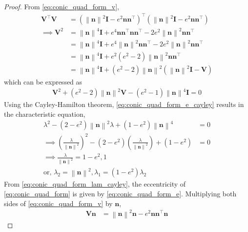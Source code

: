\documentclass[]{interact}
\theoremstyle{plain}%
\theoremstyle{definition}
\theoremstyle{remark}
\providecommand{\brak}[1]{\ensuremath{\left(#1\right)}}
\providecommand{\norm}[1]{\left\lVert#1\right\rVert}
\let\vec\mathbf
\begin{document}
\begin{proof}
  From \eqref{eq:conic_quad_form_v},
  \begin{align}
    \vec{V}^{\top} \vec{V}&=\brak{\norm{\vec{n}}^2\vec{I}-e^2\vec{n}\vec{n}^{\top}}^{\top}\brak{\norm{\vec{n}}^2\vec{I}-e^2\vec{n}\vec{n}^{\top}}
    \\
    \implies \vec{V}^{2} &= \norm{\vec{n}}^4\vec{I}+e^4\vec{n}\vec{n}^{\top}\vec{n}\vec{n}^{\top}-2e^2\norm{\vec{n}}^2\vec{n}\vec{n}^{\top}
    \\
    &= \norm{\vec{n}}^4\vec{I} + e^4\norm{\vec{n}}^2\vec{n}\vec{n}^{\top} - 2e^2\norm{\vec{n}}^2\vec{n}\vec{n}^{\top}
    \\
    &= \norm{\vec{n}}^4\vec{I} + e^2\brak{e^2 - 2}\norm{\vec{n}}^2\vec{n}\vec{n}^{\top}
    \\
    &= \norm{\vec{n}}^4\vec{I} + \brak{e^2 - 2}\norm{\vec{n}}^2\brak{\norm{\vec{n}}^2\vec{I}- \vec{V}}
    \end{align}
%    
which can be expressed as
\begin{align}
  \vec{V}^{2} + \brak{e^2 - 2}\norm{\vec{n}}^2\vec{V} - \brak{e^2 - 1}\norm{\vec{n}}^4\vec{I}=0
  \label{eq:conic_quad_form_e_cayley}
\end{align}
Using the Cayley-Hamilton theorem, \eqref{eq:conic_quad_form_e_cayley} results in the characteristic equation, 
\begin{align}
  \lambda^{2} - \brak{2-e^2}\norm{\vec{n}}^2\lambda + \brak{1-e^2 }\norm{\vec{n}}^4&=0
  \\
  \implies \brak{\frac{\lambda}{\norm{\vec{n}}^2}}^2 - \brak{2-e^2 }\brak{\frac{\lambda}{\norm{\vec{n}}^2}} + \brak{1-e^2 } &= 0
  \\
  \implies \frac{\lambda}{\norm{\vec{n}}^2} = 1-e^2, 1&
  \\
  \text{or, }\lambda_2 = \norm{\vec{n}}^2, \lambda_1 = \brak{1-e^2}\lambda_2 &
  \label{eq:conic_quad_form_lam_cayley}
\end{align}
From   \eqref{eq:conic_quad_form_lam_cayley}, the eccentricity of \eqref{eq:conic_quad_form} is given by 
\eqref{eq:conic_quad_form_e}.   
%
Multiplying both sides of    \eqref{eq:conic_quad_form_v} by $\vec{n}$,
\begin{align}
\vec{V} \vec{n}&=\norm{\vec{n}}^2\vec{n}-e^2\vec{n}\vec{n}^{\top}\vec{n} 

\end{align}
\end{proof}
\end{document}
